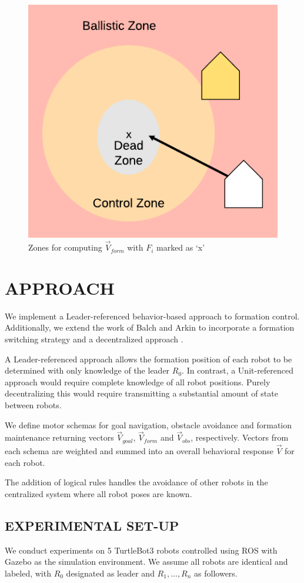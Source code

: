 \documentclass[letterpaper, 10 pt, conference]{ieeeconf}  %
\begin{document}
\begin{figure}[ht]
\centering
\includegraphics[width=0.45\linewidth]{images/formation_zones.png}
\caption{Zones for computing $\vec{V}_{form}$ with $F_i$ marked as `x'}
\label{formation_zones}
\end{figure}

\section{APPROACH}

We implement a Leader-referenced behavior-based approach to formation control. Additionally, we extend the work of Balch and Arkin to incorporate a formation switching strategy and a decentralized approach \cite{repository}.

A Leader-referenced approach allows the formation position of each robot to be determined with only knowledge of the leader $R_0$. 
In contrast, a Unit-referenced approach would require complete knowledge of all robot positions. Purely decentralizing this would require transmitting a substantial amount of state between robots.

We define motor schemas for goal navigation, obstacle avoidance and formation maintenance returning vectors $\vec{V}_{goal}$, $\vec{V}_{form}$ and $\vec{V}_{obs}$, respectively. Vectors from each schema are weighted and summed into an overall behavioral response $\vec{V}$ for each robot.

The addition of logical rules handles the avoidance of other robots in the centralized system where all robot poses are known.

\subsection{EXPERIMENTAL SET-UP}

We conduct experiments on 5 TurtleBot3 \cite{turtlebot} robots controlled using ROS \cite{ros} with Gazebo \cite{gazebo} as the simulation environment. We assume all robots are identical and labeled, with $R_0$ designated as leader and $R_1,...,R_n$ as followers. 
\end{document}
